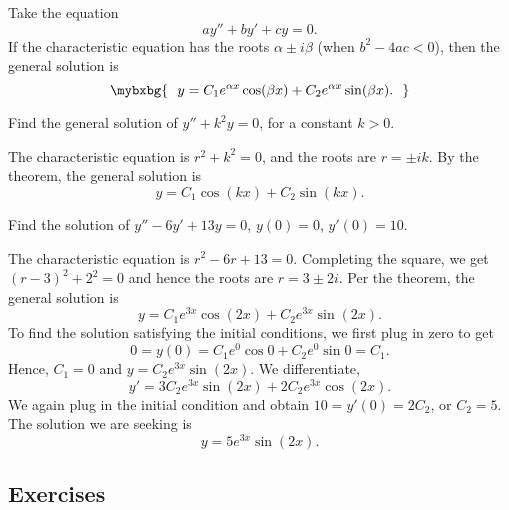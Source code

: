 \begin{theorem}
Take the equation
\begin{equation*}
ay'' + by' + cy = 0 .
\end{equation*}
If the characteristic equation has the roots $\alpha \pm i \beta$
(when $b^2 - 4ac < 0$),
then the general solution is
\begin{equation*}
\mybxbg{~~
y = C_1 e^{\alpha x} \cos (\beta x) + C_2 e^{\alpha x} \sin (\beta x) .
~~}
\end{equation*}
\end{theorem}

\begin{example} \label{example:sincossecondorder}
Find the general solution of $y'' + k^2 y = 0$, for a constant
$k > 0$.

The characteristic equation is $r^2 + k^2 = 0$,
and the roots are $r = \pm ik$.
By the theorem, the general solution is
\begin{equation*}
y = C_1 \cos (kx) + C_2 \sin (kx) .
\end{equation*}
\end{example}

\begin{example}
Find the solution of $y'' - 6 y' + 13 y = 0$, $y(0) = 0$, $y'(0) =
10$.

The characteristic equation is $r^2 - 6 r + 13 = 0$.  Completing the
square, we get ${(r-3)}^2 + 2^2 = 0$ and hence the roots are
$r = 3 \pm 2i$.
Per the theorem, the general solution is
\begin{equation*}
y = C_1 e^{3x} \cos (2x) + C_2 e^{3x} \sin (2x) .
\end{equation*}
To find the solution satisfying the initial conditions, we first plug in zero
to get
\begin{equation*}
0 = y(0) = C_1 e^{0} \cos 0 + C_2 e^{0} \sin 0  = C_1 .
\end{equation*}
Hence, $C_1 = 0$ and $y = C_2 e^{3x} \sin (2x)$.  We differentiate,
\begin{equation*}
y' = 3C_2 e^{3x} \sin (2x) + 2C_2 e^{3x} \cos (2x) .
\end{equation*}
We again plug in the initial condition and obtain $10 = y'(0) = 2C_2$, or
$C_2 = 5$.  The solution we are seeking is
\begin{equation*}
y = 5 e^{3x} \sin (2x) .
\end{equation*}
\end{example}

\subsection{Exercises}

